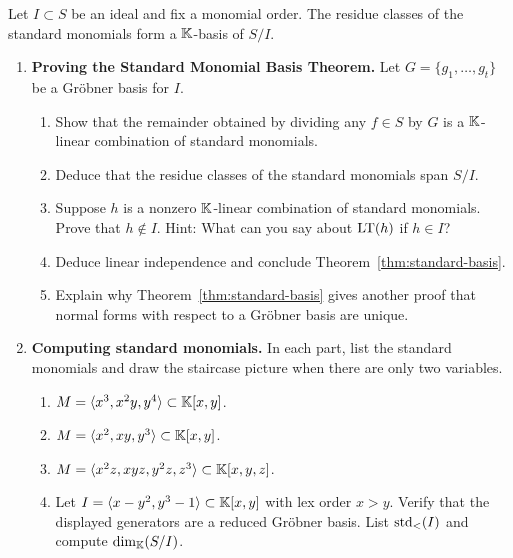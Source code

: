 \documentclass[12pt,reqno]{amsart}
\begin{document}
\begin{theorem}\label{thm:standard-basis}
Let $I\subset S$ be an ideal and fix a monomial order. The residue classes of the standard monomials form a $\mathbb{K}$-basis of $S/I$.
\end{theorem}

\hrulefill

\begin{enumerate}[leftmargin=*, resume=problems]

\item \textbf{Proving the Standard Monomial Basis Theorem.} Let $G=\{g_1,\ldots,g_t\}$ be a Gr\"obner basis for $I$.
\begin{enumerate}[label=(\alph*),ref=\theenumi\alph*]
    \item Show that the remainder obtained by dividing any $f\in S$ by $G$ is a $\mathbb{K}$-linear combination of standard monomials.
    
    \item Deduce that the residue classes of the standard monomials span $S/I$.
    
    \item Suppose $h$ is a nonzero $\mathbb{K}$-linear combination of standard monomials. Prove that $h\notin I$. Hint: What can you say about $\operatorname{LT}(h)$ if $h\in I$?
    
    \item Deduce linear independence and conclude Theorem~\ref{thm:standard-basis}.
    
    \item Explain why Theorem~\ref{thm:standard-basis} gives another proof that normal forms with respect to a Gr\"obner basis are unique.
\end{enumerate}

\item \textbf{Computing standard monomials.} In each part, list the standard monomials and draw the staircase picture when there are only two variables.
\begin{enumerate}[label=(\alph*),ref=\theenumi\alph*]
    \item $M=\langle x^3,x^2y,y^4\rangle\subset\mathbb{K}[x,y]$.
    
    \item $M=\langle x^2,xy,y^3\rangle\subset\mathbb{K}[x,y]$.
    
    \item $M=\langle x^2z,xyz,y^2z,z^3\rangle\subset\mathbb{K}[x,y,z]$.
    
    \item Let $I=\langle x-y^2,y^3-1\rangle\subset\mathbb{K}[x,y]$ with lex order $x>y$. Verify that the displayed generators are a reduced Gr\"obner basis. List $\operatorname{std}_<(I)$ and compute $\dim_{\mathbb{K}}(S/I)$.
    

\end{enumerate}
\end{enumerate}
\end{document}
